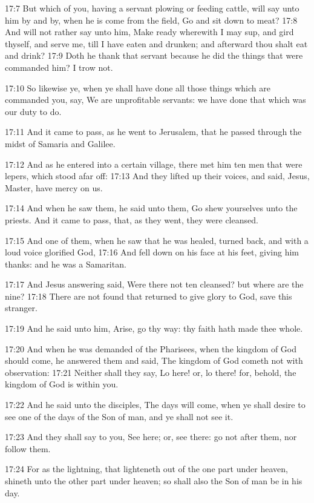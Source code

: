 17:7 But which of you, having a servant plowing or feeding cattle, will say unto him by and by, when he is come from the field, Go and sit down to meat?  17:8 And will not rather say unto him, Make ready wherewith I may sup, and gird thyself, and serve me, till I have eaten and drunken; and afterward thou shalt eat and drink?  17:9 Doth he thank that servant because he did the things that were commanded him?  I trow not.

17:10 So likewise ye, when ye shall have done all those things which are commanded you, say, We are unprofitable servants: we have done that which was our duty to do.

17:11 And it came to pass, as he went to Jerusalem, that he passed through the midst of Samaria and Galilee.

17:12 And as he entered into a certain village, there met him ten men that were lepers, which stood afar off: 17:13 And they lifted up their voices, and said, Jesus, Master, have mercy on us.

17:14 And when he saw them, he said unto them, Go shew yourselves unto the priests. And it came to pass, that, as they went, they were cleansed.

17:15 And one of them, when he saw that he was healed, turned back, and with a loud voice glorified God, 17:16 And fell down on his face at his feet, giving him thanks: and he was a Samaritan.

17:17 And Jesus answering said, Were there not ten cleansed? but where are the nine?  17:18 There are not found that returned to give glory to God, save this stranger.

17:19 And he said unto him, Arise, go thy way: thy faith hath made thee whole.

17:20 And when he was demanded of the Pharisees, when the kingdom of God should come, he answered them and said, The kingdom of God cometh not with observation: 17:21 Neither shall they say, Lo here! or, lo there! for, behold, the kingdom of God is within you.

17:22 And he said unto the disciples, The days will come, when ye shall desire to see one of the days of the Son of man, and ye shall not see it.

17:23 And they shall say to you, See here; or, see there: go not after them, nor follow them.

17:24 For as the lightning, that lighteneth out of the one part under heaven, shineth unto the other part under heaven; so shall also the Son of man be in his day.

